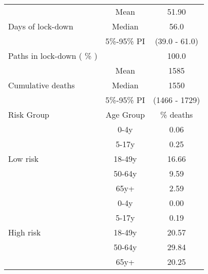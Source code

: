 \documentclass{article}
\begin{document}
\begin{table}[th]
\centering
\begin{tabular}{p{4cm}cc}
\toprule
\multirow{3}{*}{Days   of lock-down} & Mean      & 51.90                        \\ \cmidrule(l){2-3} 
                                     & Median    & 56.0                      \\ \cmidrule(l){2-3} 
                                     & 5\%-95\% PI & (39.0 - 61.0)       \\ \midrule 
\multirow{1}{*}{Paths in lock-down ( \% )} &      &         100.0              \\   \midrule                     
\multirow{3}{\hsize}{Cumulative deaths}       & Mean      & 1585 \\ \cmidrule(l){2-3} 
                                     & Median    & 1550                        \\ \cmidrule(l){2-3} 
                                     & 5\%-95\% PI & (1466 - 1729)           \\  \midrule
Risk Group                           & Age Group & \multicolumn{1}{c}{\% deaths}        \\  \midrule
\multirow{5}{*}{Low   risk}          & 0-4y      & 0.06                         \\ \cmidrule(l){2-3} 
                                     & 5-17y     & 0.25                         \\ \cmidrule(l){2-3} 
                                     & 18-49y    & 16.66                         \\ \cmidrule(l){2-3} 
                                     & 50-64y    & 9.59                         \\ \cmidrule(l){2-3} 
                                     & 65y+      & 2.59                         \\ \midrule
\multirow{5}{*}{High   risk}         & 0-4y      & 0.00                         \\ \cmidrule(l){2-3} 
                                     & 5-17y     & 0.19                         \\ \cmidrule(l){2-3} 
                                     & 18-49y    & 20.57                         \\ \cmidrule(l){2-3} 
                                     & 50-64y    & 29.84                         \\ \cmidrule(l){2-3} 
                                     & 65y+      & 20.25                         \\ \midrule

\end{tabular}
\end{table}
\end{document}
